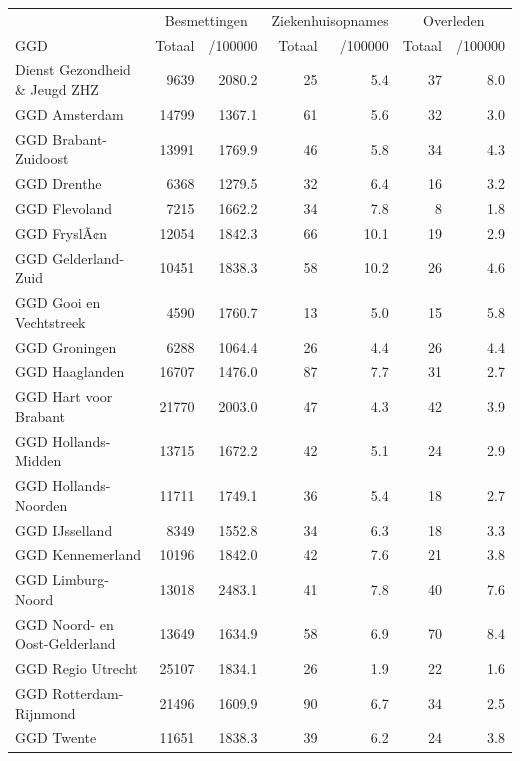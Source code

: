 \documentclass[
  english,
  man,floatsintext]{apa6}
\begin{document}
\begin{table}
\centering\begingroup\fontsize{10}{12}\selectfont

\begin{threeparttable}
\begin{tabular}{lrrrrrr}
\toprule
\multicolumn{1}{c}{ } & \multicolumn{2}{c}{Besmettingen} & \multicolumn{2}{c}{Ziekenhuisopnames} & \multicolumn{2}{c}{Overleden} \\
\cmidrule(l{3pt}r{3pt}){2-3} \cmidrule(l{3pt}r{3pt}){4-5} \cmidrule(l{3pt}r{3pt}){6-7}
GGD & Totaal & /100000 & Totaal & /100000 & Totaal & /100000\\
\midrule
Dienst Gezondheid \& Jeugd ZHZ & 9639 & 2080.2 & 25 & 5.4 & 37 & 8.0\\
GGD Amsterdam & 14799 & 1367.1 & 61 & 5.6 & 32 & 3.0\\
GGD Brabant-Zuidoost & 13991 & 1769.9 & 46 & 5.8 & 34 & 4.3\\
GGD Drenthe & 6368 & 1279.5 & 32 & 6.4 & 16 & 3.2\\
GGD Flevoland & 7215 & 1662.2 & 34 & 7.8 & 8 & 1.8\\
GGD FryslÃ¢n & 12054 & 1842.3 & 66 & 10.1 & 19 & 2.9\\
GGD Gelderland-Zuid & 10451 & 1838.3 & 58 & 10.2 & 26 & 4.6\\
GGD Gooi en Vechtstreek & 4590 & 1760.7 & 13 & 5.0 & 15 & 5.8\\
GGD Groningen & 6288 & 1064.4 & 26 & 4.4 & 26 & 4.4\\
GGD Haaglanden & 16707 & 1476.0 & 87 & 7.7 & 31 & 2.7\\
GGD Hart voor Brabant & 21770 & 2003.0 & 47 & 4.3 & 42 & 3.9\\
GGD Hollands-Midden & 13715 & 1672.2 & 42 & 5.1 & 24 & 2.9\\
GGD Hollands-Noorden & 11711 & 1749.1 & 36 & 5.4 & 18 & 2.7\\
GGD IJsselland & 8349 & 1552.8 & 34 & 6.3 & 18 & 3.3\\
GGD Kennemerland & 10196 & 1842.0 & 42 & 7.6 & 21 & 3.8\\
GGD Limburg-Noord & 13018 & 2483.1 & 41 & 7.8 & 40 & 7.6\\
GGD Noord- en Oost-Gelderland & 13649 & 1634.9 & 58 & 6.9 & 70 & 8.4\\
GGD Regio Utrecht & 25107 & 1834.1 & 26 & 1.9 & 22 & 1.6\\
GGD Rotterdam-Rijnmond & 21496 & 1609.9 & 90 & 6.7 & 34 & 2.5\\
GGD Twente & 11651 & 1838.3 & 39 & 6.2 & 24 & 3.8\\

\end{tabular}
\end{threeparttable}
\end{table}
\end{document}
